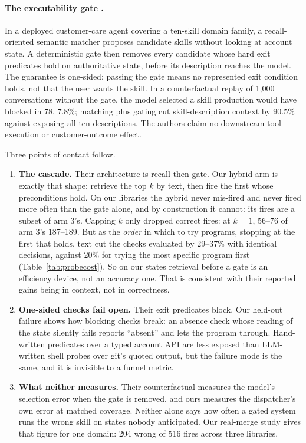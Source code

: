 \documentclass[11pt]{article}
\begin{document}
\paragraph{The executability gate \cite{wix2026gating}.}
In a deployed customer-care agent covering a ten-skill domain family, a recall-oriented semantic
matcher proposes candidate skills without looking at account state. A deterministic gate then
removes every candidate whose hard exit predicates hold on authoritative state, before its
description reaches the model. The guarantee is one-sided: passing the gate means no represented
exit condition holds, not that the user wants the skill. In a counterfactual replay of 1,000
conversations without the gate, the model selected a skill production would have blocked in 78,
7.8\%; matching plus gating cut skill-description context by 90.5\% against exposing all ten
descriptions. The authors claim no downstream tool-execution or customer-outcome effect.

Three points of contact follow.

\begin{enumerate}
  \item \textbf{The cascade.} Their architecture is recall then gate. Our hybrid arm is exactly
  that shape: retrieve the top $k$ by text, then fire the first whose preconditions hold. On our
  libraries the hybrid never mis-fired and never fired more often than the gate alone, and by
  construction it cannot: its fires are a subset of arm 3's. Capping $k$ only dropped correct
  fires: at $k=1$, 56--76 of arm 3's 187--189. But as the \emph{order} in which to try programs,
  stopping at the first that holds, text cut the checks evaluated by 29--37\% with identical
  decisions, against 20\% for trying the most specific program first
  (Table~\ref{tab:probecost}). So on our states retrieval before a gate is an efficiency device,
  not an accuracy one. That is consistent with their reported gains being in context, not in
  correctness.
  \item \textbf{One-sided checks fail open.} Their exit predicates block. Our held-out failure
  shows how blocking checks break: an absence check whose reading of the state silently fails
  reports ``absent'' and lets the program through. Hand-written predicates over a typed account
  API are less exposed than LLM-written shell probes over git's quoted output, but the failure
  mode is the same, and it is invisible to a funnel metric.
  \item \textbf{What neither measures.} Their counterfactual measures the model's selection
  error when the gate is removed, and ours measures the dispatcher's own error at matched
  coverage. Neither alone says how often a gated system runs the wrong skill on states nobody
  anticipated. Our real-merge study gives that figure for one domain: 204 wrong of 516 fires
  across three libraries.
\end{enumerate}
\end{document}
